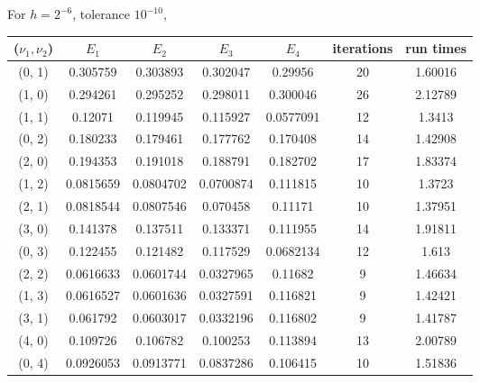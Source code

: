 \documentclass[12pt]{article}
\begin{document}
 \newpage
For $h=2^{-6}$, tolerance $10^{-10}$,
\begin{center}
\begin{tabular}{||c|cccc|c|c||}
\hline \hline
 ($\nu_1, \nu_2$)   & $E_1$ & $E_2$ &  $E_3$ & $E_4$ &   iterations & run times \\
\hline \hline
   \color{red}(0, 1)   &    \color{red}0.305759  &   \color{red}0.303893  &   \color{red}0.302047  &   \color{red}0.29956   &   \color{red}20 & \color{red}1.60016 \\
 (1, 0)   &  0.294261  &      0.295252  &      0.298011  &      0.300046  &           26 & 2.12789\\ \hline
   \color{red}(1, 1)   &   \color{red}0.12071   & \color{red}0.119945  & \color{red}0.115927  & \color{red}0.0577091 & \color{red}12 & \color{red}1.3413\\
 (0, 2)   &  0.180233  &      0.179461  &      0.177762  &      0.170408  &           14  & 1.42908 \\
 (2, 0)   &  0.194353  &      0.191018  &      0.188791  &      0.182702  &           17 & 1.83374 \\ \hline
 \color{red}(1, 2)   & \color{red}0.0815659 & \color{red}0.0804702 & \color{red}0.0700874 &      0.111815  & \color{red}10 & \color{red}1.3723 \\
 \color{red}(2, 1)   &  0.0818544 &      0.0807546 &      0.070458  & \color{red}0.11171   & \color{red}10 & 1.37951 \\
 (3, 0)   &  0.141378  &      0.137511  &      0.133371  &      0.111955  &           14 & 1.91811 \\
 (0, 3)   &  0.122455  &      0.121482  &      0.117529  &      0.0682134 &           12  & 1.613 \\ \hline
 \color{red}(2, 2)   &  0.0616633 &      0.0601744 &      0.0327965 &      0.11682   &  \color{red}9 & 1.46634\\
 \color{red}(1, 3)   &  \color{red}0.0616527 &  \color{red}0.0601636 & \color{red}0.0327591 &      0.116821  &  \color{red}9 & 1.42421\\
 \color{red}(3, 1)   &  0.061792  &      0.0603017 &      0.0332196 & \color{red}0.116802  &  \color{red}9 & \color{red}1.41787 \\
 (4, 0)   &  0.109726  &      0.106782  &      0.100253  &      0.113894  &           13 & 2.00789\\
 (0, 4)   &  0.0926053 &      0.0913771 &      0.0837286 &      0.106415  &           10 & 1.51836\\
\hline \hline
\end{tabular}
\end{center}
\end{document}
